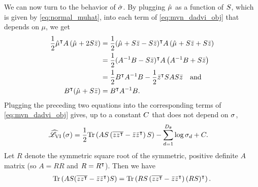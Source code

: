 We can now turn to the behavior of $\hat{\sigma}_{}$. By plugging $\hat{\mu}_{}$ as a
function of $S$, which is given by \cref{eq:normal_muhat}, into each term
of \cref{eq:mvn_dadvi_obj} that depends on $\mu$, we get
%
\begin{align*}
%
\frac{1}{2} \etamuhat^\trans A \left(\etamuhat + 2 \sigmat \zbar \right) ={}&
\frac{1}{2} (\etamuhat + \sigmat \zbar - \sigmat \zbar)^\trans
    A \left(\etamuhat + \sigmat \zbar +\sigmat \zbar \right)
\\={}&
\frac{1}{2} (A^{-1} B - \sigmat \zbar)^\trans
    A \left(A^{-1} B +\sigmat \zbar \right)
\\={}&
\frac{1}{2} B^\trans A^{-1} B - \frac{1}{2} \zbar^\trans S A S \zbar
\quad\textrm{and}\\
%
B^\trans (\etamuhat + \sigmat \zbar) ={}& B^\trans A^{-1} B.
\end{align*}
%
Plugging the preceding two equations into the corresponding terms of
\cref{eq:mvn_dadvi_obj} gives, up to a constant $C$ that does not depend on
$\sigma_{}$,
%
\begin{align}\label{eq:normal_klhat_sigma_profile}
%
\klobj{\etasigma} ={}&
\frac{1}{2} \trace{A \sigmat \left(\zzbar - \zbar \zbar^\trans\right) \sigmat}
-\sumd \log \etasigma[d] + \const.
%
\end{align}
%
Let $R$ denote the symmetric square
root of the symmetric, positive definite $A$ matrix (so $A = RR$ and $R =
R^\intercal$).  Then we have
%
\begin{align*}
%
\trace{A S (\zzbar - \zbar \zbar^\trans) S} =
    \trace{R S
        \left(\zzbar - \zbar \zbar^\trans \right) (R S)^\trans}.
%
\end{align*}

